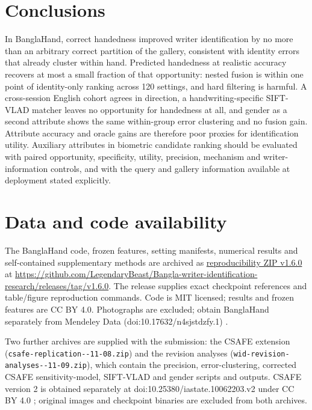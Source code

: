 \documentclass[ASNA,twocolumn]{USG}
\begin{document}
\section{Conclusions}
\label{sec:conclusions}
In BanglaHand, correct handedness improved writer identification by no more than an arbitrary correct partition of the gallery, consistent with identity errors that already cluster within hand. Predicted handedness at realistic accuracy recovers at most a small fraction of that opportunity: nested fusion is within one point of identity-only ranking across 120 settings, and hard filtering is harmful. A cross-session English cohort agrees in direction, a handwriting-specific SIFT-VLAD matcher leaves no opportunity for handedness at all, and gender as a second attribute shows the same within-group error clustering and no fusion gain. Attribute accuracy and oracle gains are therefore poor proxies for identification utility. Auxiliary attributes in biometric candidate ranking should be evaluated with paired opportunity, specificity, utility, precision, mechanism and writer-information controls, and with the query and gallery information available at deployment stated explicitly.

\section*{Data and code availability}
The BanglaHand code, frozen features, setting manifests, numerical results and self-contained supplementary methods are archived as \href{https://github.com/LegendaryBeast/Bangla-writer-identification-research/releases/download/v1.6.0/wid-reproducibility-v1.6.0.zip}{reproducibility ZIP v1.6.0} at \url{https://github.com/LegendaryBeast/Bangla-writer-identification-research/releases/tag/v1.6.0}. The release supplies exact checkpoint references and table/figure reproduction commands. Code is MIT licensed; results and frozen features are CC BY 4.0. Photographs are excluded; obtain BanglaHand separately from Mendeley Data (doi:10.17632/n4sjstdzfy.1) \cite{banglahand2026data}.

Two further archives are supplied with the submission: the CSAFE extension (\texttt{csafe-replication--11-08.zip}) and the revision analyses (\texttt{wid-revision-\allowbreak analyses--11-09.zip}), which contain the precision, error-clustering, corrected CSAFE sensitivity-model, SIFT-VLAD and gender scripts and outputs. CSAFE version 2 is obtained separately at doi:10.25380/iastate.10062203.v2 under CC BY 4.0 \cite{crawford2026csafe}; original images and checkpoint binaries are excluded from both archives.
\end{document}
